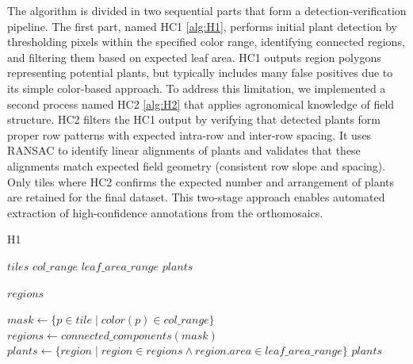 \documentclass[12pt,a4paper,oneside]{report}
\begin{document}
The algorithm is divided in two sequential parts that form a detection-verification pipeline. The first part,
named HC1 \cref{alg:H1}, performs initial plant detection by thresholding pixels within the specified color range, 
identifying connected regions, and filtering them based on expected leaf area. HC1 outputs region polygons
representing potential plants, but typically includes many false positives due to its simple color-based approach.
To address this limitation, we implemented a second process named HC2 \cref{alg:H2} that applies agronomical 
knowledge of field structure. HC2 filters the HC1 output by verifying that detected plants form proper row 
patterns with expected intra-row and inter-row spacing. It uses RANSAC to identify linear alignments of plants 
and validates that these alignments match expected field geometry (consistent row slope and spacing).
Only tiles where HC2 confirms the expected number and arrangement of plants are retained for the final dataset.
This two-stage approach enables automated extraction of high-confidence annotations from the orthomosaics.

\begin{algorithm}
    \caption{H1}
    \label{alg:H1}
    \begin{algorithmic}[1]
    \Require $tiles$ 
    \Require $col\_range$ 
    \Require $leaf\_area\_range$ 
    \Ensure $plants$ 
    
     \cite{wuOptimizingConnectedComponent2005} 
        \State \Return $regions$
    \EndFunction
    
      \State $mask \gets \{p \in tile \mid color(p) \in col\_range\}$
      \State $regions \gets connected\_components(mask)$
      \State $plants \gets \{region \mid region \in regions \land region.area \in leaf\_area\_range\}$
    \EndFor
    \State \Return $plants$
  \end{algorithmic}
  \end{algorithm}
  
\end{document}
